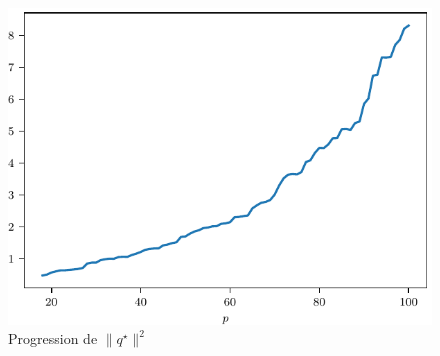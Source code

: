 \begin{figure}[h]
  \centering
  \includegraphics[width=\textwidth]{../../experiments/fig/np_normqp.pdf}
  \caption{Progression de $\|q^\star\|^2$}
  \label{fig_np_normqp}
\end{figure}

\clearpage

